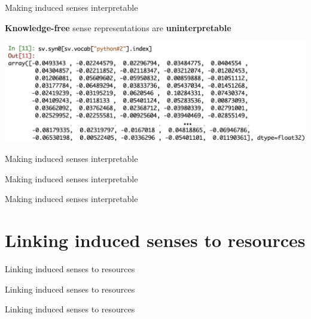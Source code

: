 \documentclass{beamer}
\begin{document}
\begin{frame}{ Making induced senses interpretable }

\vspace{-1em}

\textbf{Knowledge-free} sense representations are \alert{\textbf{uninterpretable}}
	\begin{center}
	\includegraphics[width=1.\textwidth]{numpy}
	\end{center}

	
\end{frame}


\begin{frame}{ Making induced senses interpretable }
	
\end{frame}


\begin{frame}{ Making induced senses interpretable }
	
\end{frame}


\begin{frame}{ Making induced senses interpretable }
	
\end{frame}


\section{Linking induced senses to resources}

\begin{frame}{ Linking induced senses to resources }
	
\end{frame}


\begin{frame}{ Linking induced senses to resources }
	
\end{frame}


\begin{frame}{ Linking induced senses to resources }
	
\end{frame}
\end{document}
